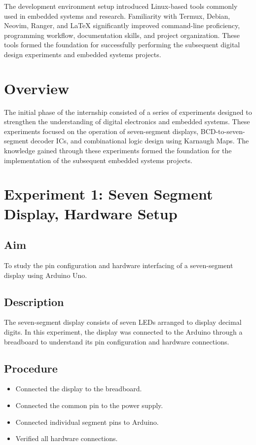 \documentclass[12pt,a4paper]{report}
\begin{document}
The development environment setup introduced Linux-based tools commonly used in embedded systems and research. Familiarity with Termux, Debian, Neovim, Ranger, and \LaTeX{} significantly improved command-line proficiency, programming workflow, documentation skills, and project organization. These tools formed the foundation for successfully performing the subsequent digital design experiments and embedded systems projects.

\section{Overview}

The initial phase of the internship consisted of a series of experiments designed to strengthen the understanding of digital electronics and embedded systems. These experiments focused on the operation of seven-segment displays, BCD-to-seven-segment decoder ICs, and combinational logic design using Karnaugh Maps. The knowledge gained through these experiments formed the foundation for the implementation of the subsequent embedded systems projects.

\section{Experiment 1: Seven Segment Display, Hardware Setup}

\subsection*{Aim}

To study the pin configuration and hardware interfacing of a seven-segment display using Arduino Uno.

\subsection*{Description}

The seven-segment display consists of seven LEDs arranged to display decimal digits. In this experiment, the display was connected to the Arduino through a breadboard to understand its pin configuration and hardware connections.

\subsection*{Procedure}

\begin{itemize}
\item Connected the display to the breadboard.
\item Connected the common pin to the power supply.
\item Connected individual segment pins to Arduino.
\item Verified all hardware connections.
\end{itemize}
\end{document}
